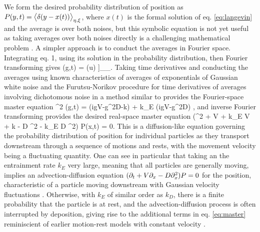 We form the desired probability distribution of position as $ P(y,t) = \big\langle \delta(y-x(t))\big\rangle_{\eta,\xi} $, where $x(t)$ is the formal solution of eq. \ref{eq:langevin} and the average is over both noises, but this symbolic equation is not yet useful as taking averages over both noises directly is a challenging mathematical problem \citep{Hanggi1978}.
A simpler approach is to conduct the averages in Fourier space. Integrating eq. 1, using its solution in the probability distribution, then Fourier transforming gives
\be {}(g,t) = \Big\bra  \Big\bra \exp \Big[- i g \int_0^t du [V+\sqrt{2D}\xi(u)]\eta(u) \Big]\Big\ket_\eta \Big\ket_\xi.\ee
Taking time derivatives and conducting the averages using known characteristics of averages of exponentials of Gaussian white noise \citep{Gardiner1983,VanKampen2007} and the Furutsu-Norikov procedure for time derivatives of averages involving dichotomous noise \citep{Shapiro1978} in a method similar to \citep{Balakrishnan1993} provides the Fourier-space master equation
\be \pt^2 (g,t)  = (igV-g^2D-k)\pt  {} + k_E (igV-g^2D) ,\ee
and inverse Fourier transforming provides the desired real-space master equation
\be (\pt^2 + V \px \pt + k_E V \px + k \pt - D \px^2 \pt - k_E D \px^2) P(x,t) = 0. \label{eq:master}\ee
This is a diffusion-like equation governing the probability distribution of position for individual particles as they transport downstream through a sequence of motions and rests, with the movement velocity being a fluctuating quantity.
One can see in particular that taking an the entrainment rate $k_E$ very large, meaning that all particles are generally moving, implies an advection-diffusion equation $(\partial_t + V\partial_x -D \partial_x^2)P=0$ for the position, characteristic of a particle moving downstream with Gaussian velocity fluctuations \citep{Ancey2014}. Otherwise, with $k_E$ of similar order as $k_D$, there is a finite probability that the particle is at rest, and the advection-diffusion process is often interrupted by deposition, giving rise to the additional terms in eq. \ref{eq:master} reminiscient of earlier motion-rest models with constant velocity \citep{Lisle1998,Lajeunesse2017}.

